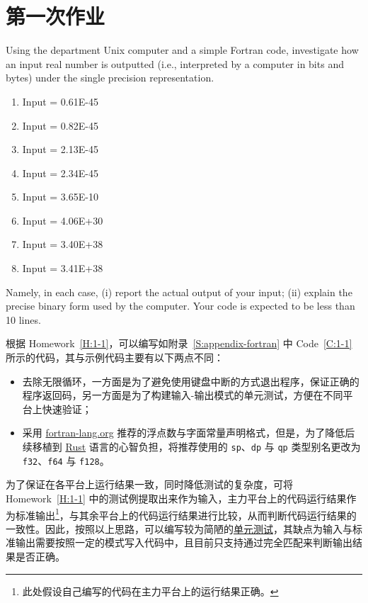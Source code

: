 \section{第一次作业}

\begin{homework}[label={H:1-1}]
    Using the department Unix computer and a simple Fortran code, investigate how an input real number is outputted (i.e., interpreted by a computer in bits and bytes) under the single precision representation.

    \begin{enumerate}[label=(\alph*)]
        \item Input = 0.61E-45
        \item Input = 0.82E-45
        \item Input = 2.13E-45
        \item Input = 2.34E-45
        \item Input = 3.65E-10
        \item Input = 4.06E+30
        \item Input = 3.40E+38
        \item Input = 3.41E+38
    \end{enumerate}

    Namely, in each case, (i) report the actual output of your input; (ii) explain the precise binary form used by the computer. Your code is expected to be less than 10 lines.
\end{homework}

根据 Homework~\ref{H:1-1}，可以编写如附录~\ref{S:appendix-fortran} 中 Code~\ref{C:1-1} 所示的代码，其与示例代码主要有以下两点不同：

\begin{itemize}
    \item 去除无限循环，一方面是为了避免使用键盘中断的方式退出程序，保证正确的程序返回码，另一方面是为了构建输入-输出模式的单元测试，方便在不同平台上快速验证；
    \item 采用 \href{https://fortran-lang.org/learn/quickstart/variables}{fortran-lang.org} 推荐的浮点数与字面常量声明格式，但是，为了降低后续移植到 \href{https://www.rust-lang.org}{Rust} 语言的心智负担，将推荐使用的 \verb|sp|、\verb|dp| 与 \verb|qp| 类型别名更改为 \verb|f32|、\verb|f64| 与 \verb|f128|。
\end{itemize}

为了保证在各平台上运行结果一致，同时降低测试的复杂度，可将 Homework~\ref{H:1-1} 中的测试例提取出来作为输入，主力平台上的代码运行结果作为标准输出\footnote{此处假设自己编写的代码在主力平台上的运行结果正确。}，与其余平台上的代码运行结果进行比较，从而判断代码运行结果的一致性。因此，按照以上思路，可以编写较为简陋的\href{https://github.com/iydon/CFDRust/blob/main/mae5005/test.py}{单元测试}，其缺点为输入与标准输出需要按照一定的模式写入代码中，且目前只支持通过完全匹配来判断输出结果是否正确。


